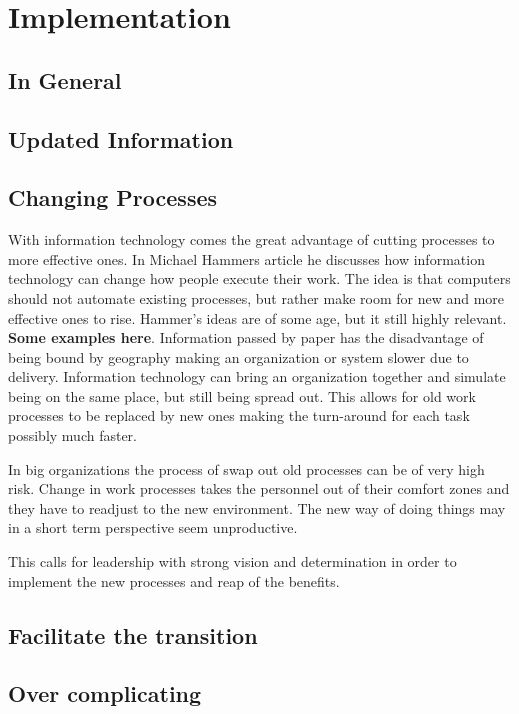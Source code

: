 \chapter{Implementation}
\section{In General}

\section{Updated Information}
\section{Changing Processes}
With information technology comes the great advantage of cutting processes to more effective ones.
In Michael Hammers article \cite{mh:rw} he discusses how information technology can change how people execute their work.
The idea is that computers should not automate existing processes, but rather make room for new and more effective ones to rise.
Hammer's ideas are of some age, but it still highly relevant. 
\textbf{Some examples here}. 
Information passed by paper has the disadvantage of being bound by geography making an organization or system slower due to delivery.
Information technology can bring an organization together and simulate being on the same place, but still being spread out.
This allows for old work processes to be replaced by new ones making the turn-around for each task possibly much faster.

In big organizations the process of swap out old processes can be of very high risk. 
Change in work processes takes the personnel out of their comfort zones and they have to readjust to the new environment. 
The new way of doing things may in a short term perspective seem unproductive.

This calls for leadership with strong vision and determination in order to implement the new processes and reap of the benefits.

\section{Facilitate the transition}


\section{Over complicating}
